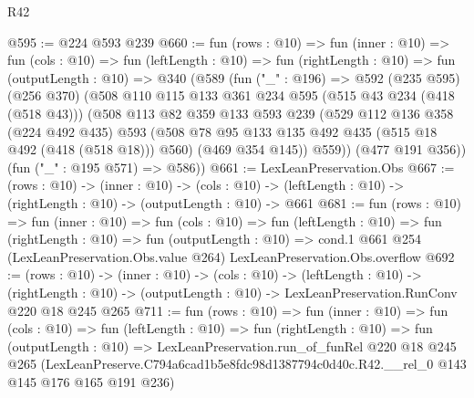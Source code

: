 \begin{lexlean}{R42}
\begin{coremodule}
@595 := @224 @593 @239
@660 := fun (rows : @10) =>
  fun (inner : @10) =>
  fun (cols : @10) =>
  fun (leftLength : @10) =>
  fun (rightLength : @10) =>
  fun (outputLength : @10) =>
  @340
    (@589
      (fun ("_" : @196) =>
      @592
        (@235 @595)
        (@256 @370)
        (@508
          @110
          @115
          @133
          @361
          @234
          @595
          (@515 @43 @234 (@418 (@518 @43)))
          (@508
            @113
            @82
            @359
            @133
            @593
            @239
            (@529
              @112
              @136
              @358
              (@224 @492 @435)
              @593
              (@508 @78 @95 @133 @135 @492 @435 (@515 @18 @492 (@418 (@518 @18))) @560)
              (@469 @354 @145))
            @559))
        (@477 @191 @356))
      (fun ("_" : @195 @571) => @586))
@661 := LexLeanPreservation.Obs
@667 := (rows : @10) ->
  (inner : @10) ->
  (cols : @10) -> (leftLength : @10) -> (rightLength : @10) -> (outputLength : @10) -> @661
@681 := fun (rows : @10) =>
  fun (inner : @10) =>
  fun (cols : @10) =>
  fun (leftLength : @10) =>
  fun (rightLength : @10) =>
  fun (outputLength : @10) =>
  cond.{1} @661 @254 (LexLeanPreservation.Obs.value @264) LexLeanPreservation.Obs.overflow
@692 := (rows : @10) ->
  (inner : @10) ->
  (cols : @10) ->
  (leftLength : @10) ->
  (rightLength : @10) -> (outputLength : @10) -> LexLeanPreservation.RunConv @220 @18 @245 @265
@711 := fun (rows : @10) =>
  fun (inner : @10) =>
  fun (cols : @10) =>
  fun (leftLength : @10) =>
  fun (rightLength : @10) =>
  fun (outputLength : @10) =>
  LexLeanPreservation.run_of_funRel
    @220
    @18
    @245
    @265
    (LexLeanPreserve.C794a6cad1b5e8fdc98d1387794c0d40c.R42.__rel_0 @143 @145 @176 @165 @191 @236)
\end{coremodule}
\end{lexlean}
